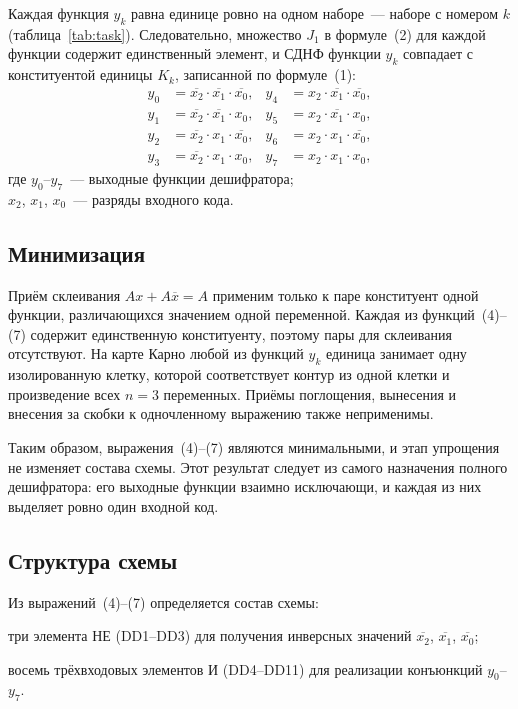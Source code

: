 \documentclass[14pt,a4paper]{extarticle}
\newcommand{\inv}[1]{\overline{#1}}
\begin{document}
Каждая функция $y_k$ равна единице ровно на одном наборе~--- наборе с номером $k$ (таблица~\ref{tab:task}). Следовательно, множество $J_1$ в формуле~(2) для каждой функции содержит единственный элемент, и СДНФ функции $y_k$ совпадает с конституентой единицы $K_k$, записанной по формуле~(1):
\begin{align}
y_0 &= \inv{x_2}\cdot\inv{x_1}\cdot\inv{x_0}, & y_4 &= x_2\cdot\inv{x_1}\cdot\inv{x_0}, \\
y_1 &= \inv{x_2}\cdot\inv{x_1}\cdot x_0,      & y_5 &= x_2\cdot\inv{x_1}\cdot x_0, \\
y_2 &= \inv{x_2}\cdot x_1\cdot\inv{x_0},      & y_6 &= x_2\cdot x_1\cdot\inv{x_0}, \\
y_3 &= \inv{x_2}\cdot x_1\cdot x_0,           & y_7 &= x_2\cdot x_1\cdot x_0,
\end{align}
\noindent где $y_0$--$y_7$~--- выходные функции дешифратора;\\
$x_2$, $x_1$, $x_0$~--- разряды входного кода.

\subsection{Минимизация}

Приём склеивания $A x + A \inv{x} = A$ применим только к паре конституент одной функции, различающихся значением одной переменной. Каждая из функций~(4)--(7) содержит единственную конституенту, поэтому пары для склеивания отсутствуют. На карте Карно любой из функций $y_k$ единица занимает одну изолированную клетку, которой соответствует контур из одной клетки и произведение всех $n = 3$ переменных. Приёмы поглощения, вынесения и внесения за скобки к одночленному выражению также неприменимы.

Таким образом, выражения~(4)--(7) являются минимальными, и этап упрощения не изменяет состава схемы. Этот результат следует из самого назначения полного дешифратора: его выходные функции взаимно исключающи, и каждая из них выделяет ровно один входной код.

\subsection{Структура схемы}

Из выражений~(4)--(7) определяется состав схемы:
\begin{dashlist}
\item три элемента НЕ (DD1--DD3) для получения инверсных значений $\inv{x_2}$, $\inv{x_1}$, $\inv{x_0}$;
\item восемь трёхвходовых элементов И (DD4--DD11) для реализации конъюнкций $y_0$--$y_7$.
\end{dashlist}
\end{document}
